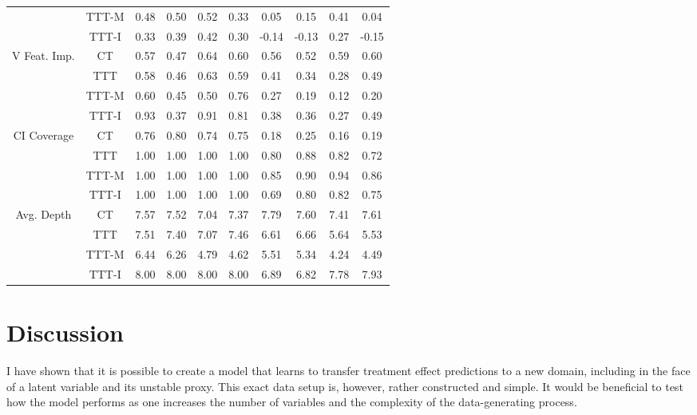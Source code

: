 \documentclass[a4paper,12pt]{article}
\theoremstyle{proposition}
\begin{document}
\begin{table}
\begin{center}
\begin{tabular}{|c|c||c|c|c|c||c|c|c|c|}
     & TTT-M &   0.48 &    0.50 &      0.52 &       0.33 &   0.05 &    0.15 &      0.41 &       0.04  \\
     & TTT-I &   0.33 &    0.39 &      0.42 &       0.30 &  -0.14 &   -0.13 &      0.27 &      -0.15  \\
\hline
\hline
\multirow{4}{6em}{V Feat. Imp.} &    CT &   0.57 &    0.47 &      0.64 &       0.60 &   0.56 &    0.52 &      0.59 &       0.60  \\
 &   TTT &   0.58 &    0.46 &      0.63 &       0.59 &   0.41 &    0.34 &      0.28 &       0.49  \\
 & TTT-M &   0.60 &    0.45 &      0.50 &       0.76 &   0.27 &    0.19 &      0.12 &       0.20  \\
 & TTT-I &   0.93 &    0.37 &      0.91 &       0.81 &   0.38 &    0.36 &      0.27 &       0.49  \\
\hline
\hline
\multirow{4}{6em}{CI Coverage}  &    CT &   0.76 &    0.80 &      0.74 &       0.75 &   0.18 &    0.25 &      0.16 &       0.19  \\
  &   TTT &   1.00 &    1.00 &      1.00 &       1.00 &   0.80 &    0.88 &      0.82 &       0.72  \\
  & TTT-M &   1.00 &    1.00 &      1.00 &       1.00 &   0.85 &    0.90 &      0.94 &       0.86  \\
  & TTT-I &   1.00 &    1.00 &      1.00 &       1.00 &   0.69 &    0.80 &      0.82 &       0.75  \\
\hline
\hline
\multirow{4}{6em}{Avg. Depth}   &    CT &   7.57 &    7.52 &      7.04 &       7.37 &   7.79 &    7.60 &      7.41 &       7.61  \\
   &   TTT &   7.51 &    7.40 &      7.07 &       7.46 &   6.61 &    6.66 &      5.64 &       5.53  \\
   & TTT-M &   6.44 &    6.26 &      4.79 &       4.62 &   5.51 &    5.34 &      4.24 &       4.49  \\
   & TTT-I &   8.00 &    8.00 &      8.00 &       8.00 &   6.89 &    6.82 &      7.78 &       7.93  \\
\hline
\end{tabular}
\end{center}
\end{table}


\section{Discussion}

I have shown that it is possible to create a model that learns to transfer treatment effect predictions to a new domain, including in the face of a latent variable and its unstable proxy. This exact data setup is, however, rather constructed and simple. It would be beneficial to test how the model performs as one increases the number of variables and the complexity of the data-generating process.
\end{document}

